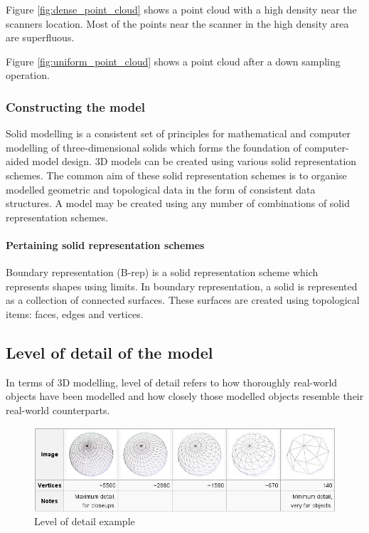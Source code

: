 \documentclass[11pt,a4paper]{report}
\begin{document}
						Figure \ref{fig:dense_point_cloud} shows a point cloud with a high density near the scanners location. Most of the points near the scanner in the high density area are superfluous.
						
						Figure \ref{fig:uniform_point_cloud} shows a point cloud after a down sampling operation.
				
			\subsubsection{Constructing the model}
				Solid modelling is a consistent set of principles for mathematical and computer modelling of three-dimensional solids which forms the foundation of computer-aided model design. 
				\cite{vadim_shapiro_solid_2001}
				3D models can be created using various solid representation schemes. The common aim of these solid representation schemes is to organise modelled geometric and topological data in the form of consistent data structures. A model may be created using any number of combinations of solid representation schemes.
				
				
				\paragraph{Pertaining solid representation schemes}
					Boundary representation (B-rep) is a solid representation scheme which represents shapes using limits. In boundary representation, a solid is represented as a collection of connected surfaces. These surfaces are created using topological items: faces, edges and vertices.
					\cite{hongxin_zhang_introduction_2007}
				
		\subsection{Level of detail of the model}
			In terms of 3D modelling, level of detail refers to how thoroughly real-world objects have been modelled and how closely those modelled objects resemble their real-world counterparts.
			
			\begin{figure}[H]
				\centering
				\includegraphics[width=1\textwidth]{level_of_detail_example}
				\caption{Level of detail example}
			\end{figure}
			
\end{document}
